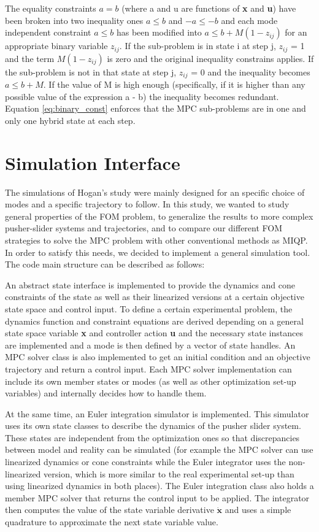 \documentclass[12,twoside]{TFG-GM}
\theoremstyle{definition}
\theoremstyle{remark}
\begin{document}
The equality constraints $a = b$ (where a and u are functions of \textbf{x} and \textbf{u}) have been broken into two inequality ones $a \leq b$ and $-a \leq -b$ and each mode independent constraint $a \leq b$ has been modified into $a \leq b + M(1 - z_{ij})$ for an appropriate binary variable $z_{ij}$. If the sub-problem is in state i at step j, $z_{ij}$ = 1 and the term $M(1 - z_{ij})$ is zero and the original inequality constrains applies. If the sub-problem is not in that state at step j, $z_{ij}$ = 0 and the inequality becomes $a \leq b + M$. If the value of M is high enough (specifically, if it is higher than any possible value of the expression a - b) the inequality becomes redundant. Equation \ref{eq:binary_const} enforces that the MPC sub-problems are in one and only one hybrid state at each step.

\section{Simulation Interface}
\label{sec:sim}

The simulations of Hogan's study were mainly designed for an specific choice of modes and a specific trajectory to follow. In this study, we wanted to study general properties of the FOM problem, to generalize the results to more complex pusher-slider systems and trajectories, and to compare our different FOM strategies to solve the MPC problem with other conventional methods as MIQP. In order to satisfy this needs, we decided to implement a general simulation tool. The code main structure can be described as follows:

An abstract state interface is implemented to provide the dynamics and cone constraints of the state as well as their linearized versions at a certain objective state space and control input. To define a certain experimental problem, the dynamics function and constraint equations are derived depending on a general state space variable \textbf{x} and controller action \textbf{u} and the necessary state instances are implemented and a mode is then defined by a vector of state handles. An MPC solver class is also implemented to get an initial condition and an objective trajectory and return a control input. Each MPC solver implementation can include its own member states or modes (as well as other optimization set-up variables) and internally decides how to handle them.

At the same time, an Euler integration simulator is implemented. This simulator uses its own state classes to describe the dynamics of the pusher slider system. These states are independent from the optimization ones so that discrepancies between model and reality can be simulated (for example the MPC solver can use linearized dynamics or cone constraints while the Euler integrator uses the non-linearized version, which is more similar to the real experimental set-up than using linearized dynamics in both places). The Euler integration class also holds a member MPC solver that returns the control input to be applied. The integrator then computes the value of the state variable derivative $\dot{\textbf{x}}$ and uses a simple quadrature to approximate the next state variable value.
\end{document}

